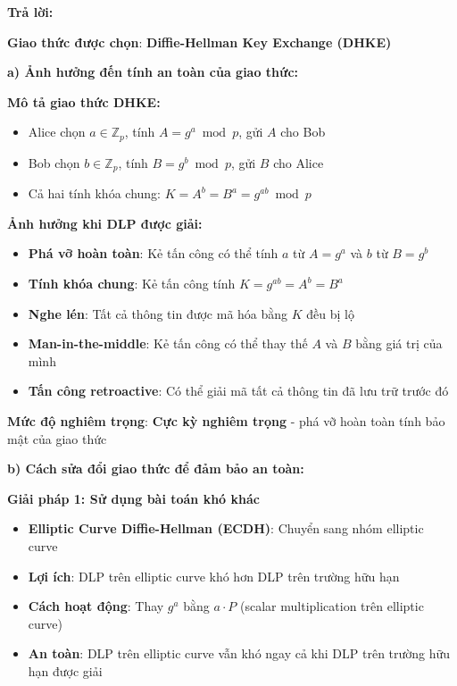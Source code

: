 \begin{center}
\textbf{Trả lời:}
\end{center}

\textbf{Giao thức được chọn}: \textbf{Diffie-Hellman Key Exchange (DHKE)}

\textbf{a) Ảnh hưởng đến tính an toàn của giao thức:}

\textbf{Mô tả giao thức DHKE:}
\begin{itemize}
    \item Alice chọn $a \in \mathbb{Z}_p$, tính $A = g^a \bmod p$, gửi $A$ cho Bob
    \item Bob chọn $b \in \mathbb{Z}_p$, tính $B = g^b \bmod p$, gửi $B$ cho Alice
    \item Cả hai tính khóa chung: $K = A^b = B^a = g^{ab} \bmod p$
\end{itemize}

\textbf{Ảnh hưởng khi DLP được giải:}
\begin{itemize}
    \item \textbf{Phá vỡ hoàn toàn}: Kẻ tấn công có thể tính $a$ từ $A = g^a$ và $b$ từ $B = g^b$
    \item \textbf{Tính khóa chung}: Kẻ tấn công tính $K = g^{ab} = A^b = B^a$
    \item \textbf{Nghe lén}: Tất cả thông tin được mã hóa bằng $K$ đều bị lộ
    \item \textbf{Man-in-the-middle}: Kẻ tấn công có thể thay thế $A$ và $B$ bằng giá trị của mình
    \item \textbf{Tấn công retroactive}: Có thể giải mã tất cả thông tin đã lưu trữ trước đó
\end{itemize}

\textbf{Mức độ nghiêm trọng}: \textbf{Cực kỳ nghiêm trọng} - phá vỡ hoàn toàn tính bảo mật của giao thức

\textbf{b) Cách sửa đổi giao thức để đảm bảo an toàn:}

\textbf{Giải pháp 1: Sử dụng bài toán khó khác}
\begin{itemize}
    \item \textbf{Elliptic Curve Diffie-Hellman (ECDH)}: Chuyển sang nhóm elliptic curve
    \item \textbf{Lợi ích}: DLP trên elliptic curve khó hơn DLP trên trường hữu hạn
    \item \textbf{Cách hoạt động}: Thay $g^a$ bằng $a \cdot P$ (scalar multiplication trên elliptic curve)
    \item \textbf{An toàn}: DLP trên elliptic curve vẫn khó ngay cả khi DLP trên trường hữu hạn được giải
\end{itemize}

